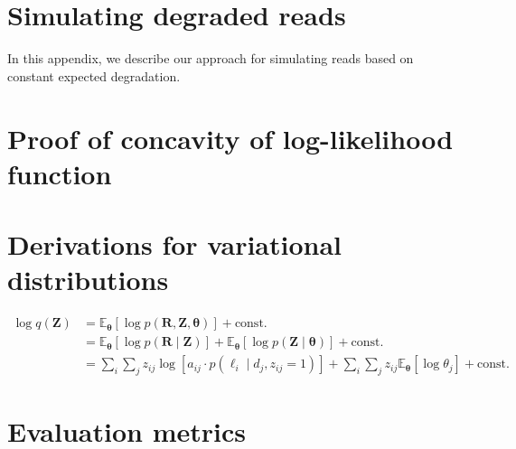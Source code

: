 \chapter{Simulating degraded reads}

In this appendix, we describe our approach for simulating reads based on constant expected degradation.

\chapter{Proof of concavity of log-likelihood function}\label{sec:proof-log-lik}

\lipsum[77]

\chapter{Derivations for variational distributions}\label{sec:variational-dist}

\begin{equation}
\begin{split}
    \log q(\bm{Z}) & = \mathbb{E}_{\bm\theta}\left[\log p(\bm{R},\bm{Z},\bm{\theta})\right] + \textrm{const.} \\
    & = \mathbb{E}_{\bm\theta}\left[\log p(\bm{R}\mid\bm{Z})\right] + \mathbb{E}_{\bm\theta}\left[\log p(\bm{Z}\mid\bm{\theta})\right] + \textrm{const.} \\
    & = \sum_i\sum_j z_{ij}\log\left[a_{ij}\cdot p(\ell_i\mid d_j,z_{ij}=1)\right] + \sum_i\sum_j z_{ij}\mathbb{E}_{\bm\theta}\left[\log\theta_j\right] + \textrm{const.}
\end{split}
\end{equation}

\chapter{Evaluation metrics}

\lipsum[32]